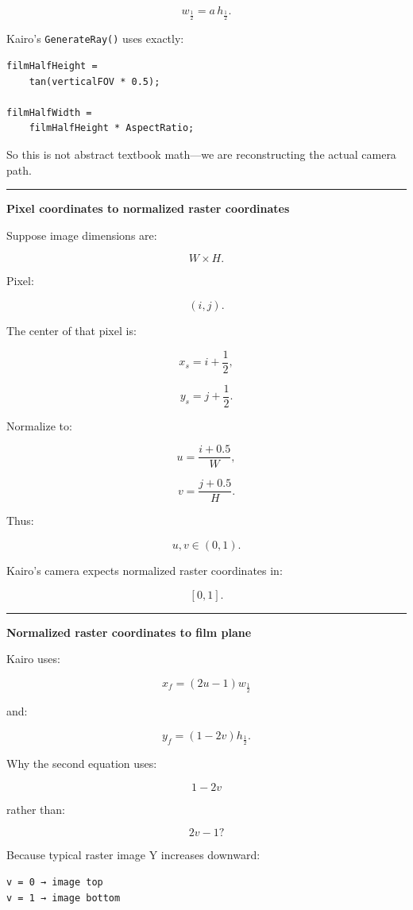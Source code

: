 \[
\boxed{
w_{\frac12}
=
a\,h_{\frac12}.
}
\]

Kairo's \texttt{GenerateRay()} uses exactly:

\begin{verbatim}
filmHalfHeight =
    tan(verticalFOV * 0.5);

filmHalfWidth =
    filmHalfHeight * AspectRatio;
\end{verbatim}

So this is not abstract textbook math---we are reconstructing the actual camera path.

\begin{center}\rule{0.5\linewidth}{0.5pt}\end{center}

\textbf{Pixel coordinates to normalized raster coordinates}

Suppose image dimensions are:

\[
W\times H.
\]

Pixel:

\[
(i,j).
\]

The center of that pixel is:

\[
x_s=i+\frac12,
\]

\[
y_s=j+\frac12.
\]

Normalize to:

\[
u=\frac{i+0.5}{W},
\]

\[
v=\frac{j+0.5}{H}.
\]

Thus:

\[
u,v\in(0,1).
\]

Kairo's camera expects normalized raster coordinates in:

\[
[0,1].
\]

\begin{center}\rule{0.5\linewidth}{0.5pt}\end{center}

\textbf{Normalized raster coordinates to film plane}

Kairo uses:

\[
x_f=(2u-1)w_{\frac12}
\]

and:

\[
y_f=(1-2v)h_{\frac12}.
\]

Why the second equation uses:

\[
1-2v
\]

rather than:

\[
2v-1?
\]

Because typical raster image Y increases downward:

\begin{verbatim}
v = 0 → image top
v = 1 → image bottom
\end{verbatim}

